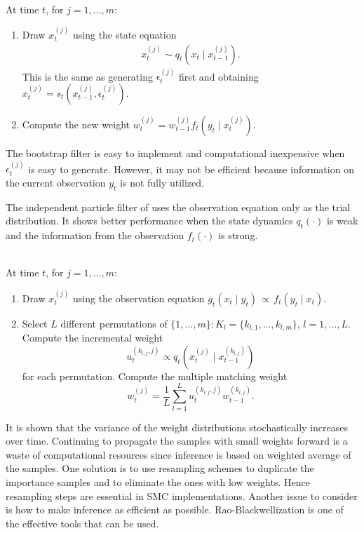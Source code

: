 \\
At time $t$, for $j=1,\ldots,m$:
\begin{enumerate}
\item Draw $x_t^{(j)}$ using the state equation
\begin{align*}
x_t^{(j)} \sim q_t(x_t \mid x_{t-1}^{(j)}).
\end{align*}
This is the same as generating $\epsilon_t^{(j)}$ first and obtaining $x_t^{(j)}=s_t(x_{t-1}^{(j)}, \epsilon_t^{(j)})$.
\item Compute the new weight $w_t^{(j)}=w_{t-1}^{(j)}f_t(y_t\mid x_t^{(j)})$.
\end{enumerate}

The bootstrap filter is easy to implement and computational inexpensive when $\epsilon_t^{(j)}$ is easy to generate. However, it may not be efficient because information on the current observation $y_t$ is not fully utilized.

The independent particle filter of \cite{lin2005} uses the observation equation only as the trial distribution. It shows better performance when the state dynamics $q_t(\cdot)$ is weak and the information from the observation $f_t(\cdot)$ is strong.

\\
At time $t$, for $j=1,\ldots,m$:
\begin{enumerate}
\item Draw $x_t^{(j)}$ using the observation equation $g_t(x_t\mid y_t)\, \propto\, f_t(y_t \mid x_t)$.
\item Select $L$ different permutations of $\{1,\ldots,m\}: K_l=\{k_{l,1},\ldots, k_{l,m}\}$, $l=1,\ldots,L$. Compute the incremental weight
\[
u_t^{(k_{l,j},j)}\propto q_t(x_t^{(j)}\mid x_{t-1}^{(k_{l,j})})
\]
for each permutation. Compute the multiple matching weight
\[
w_t^{(j)}=\frac{1}{L} \sum_{l=1}^L u_t^{(k_{l,j},j)} w_{t-1}^{(k_{l,j})}.
\]
\end{enumerate}

It is shown that the variance of the weight distributions stochastically increases over time. Continuing to propagate the samples with small weights forward is a waste of computational resources since inference is based on weighted average of the samples. One solution is to use resampling schemes to duplicate the importance samples and to eliminate the ones with low weights. Hence resampling steps are essential in SMC implementations. Another issue to consider is how to make inference as efficient as possible. Rao-Blackwellization is one of the effective tools that can be used.

